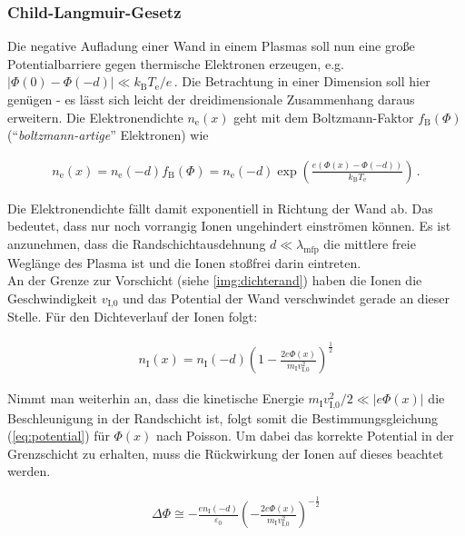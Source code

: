 \documentclass[numbers=noenddot,a4paper]{scrartcl}
\newcommand{\ix}[1]{_\text{#1}}
\newcommand{\tilt}[1]{\textit{#1}}
\begin{document}
		\subsubsection{Child-Langmuir-Gesetz} \label{subsub:childlang}
		
		Die negative Aufladung einer Wand in einem Plasmas soll nun eine große Potentialbarriere gegen thermische Elektronen erzeugen, e.g. $|\Phi\left(0\right)-\Phi\left(-d\right)|\ll k\ix{B}T\ix{e}/e\,$. Die Betrachtung in einer Dimension soll hier genügen - es lässt sich leicht der dreidimensionale Zusammenhang daraus erweitern. Die Elektronendichte $n\ix{e}\left(x\right)$ geht mit dem Boltzmann-Faktor $f\ix{B}\left(\Phi\right)$ ("`\tilt{boltzmann-artige}"' Elektronen) wie
		
			\begin{align}
				n\ix{e}\left(x\right)=n\ix{e}\left(-d\right)f\ix{B}\left(\Phi\right)=n\ix{e}\left(-d\right)\exp\left(\frac{e\left(\Phi\left(x\right)-\Phi\left(-d\right)\right)}{k\ix{B}T\ix{e}}\right) \, .
			\end{align}
			
		Die Elektronendichte fällt damit exponentiell in Richtung der Wand ab. Das bedeutet, dass nur noch vorrangig Ionen ungehindert einströmen können. Es ist anzunehmen, dass die Randschichtausdehnung $d\ll\lambda\ix{mfp}$ die mittlere freie Weglänge des Plasma ist und die Ionen stoßfrei darin eintreten.\\
		An der Grenze zur Vorschicht (siehe \ref{img:dichterand}) haben die Ionen die Geschwindigkeit $v\ix{I,0}$ und das Potential der Wand verschwindet gerade an dieser Stelle. Für den Dichteverlauf der Ionen folgt:
		
			\begin{align}
				n\ix{I}\left(x\right)=n\ix{I}\left(-d\right)\left(1-\frac{2e\Phi\left(x\right)}{m\ix{I}v\ix{I,0}^2}\right)^{\frac{1}{2}}
			\end{align}
			
		Nimmt man weiterhin an, dass die kinetische Energie $m\ix{I}v\ix{I,0}^2/2\ll |e\Phi\left(x\right)|$ die Beschleunigung in der Randschicht ist, folgt somit die Bestimmungsgleichung (\ref{eq:potential}) für $\Phi\left(x\right)$ nach Poisson. Um dabei das korrekte Potential in der Grenzschicht zu erhalten, muss die Rückwirkung der Ionen auf dieses beachtet werden.
		
			\begin{align}
				\Delta\Phi\cong-\frac{en\ix{I}\left(-d\right)}{\varepsilon\ix{0}}\left(-\frac{2e\Phi\left(x\right)}{m\ix{I}v\ix{I,0}^2}\right)^{-\frac{1}{2}} \label{eq:potential}
			\end{align}
			
\end{document}
